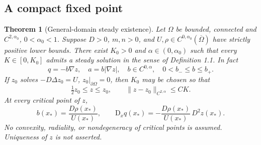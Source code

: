 \documentclass[11pt,a4paper]{article}
\newtheorem{theorem}{Theorem}[section]
\theoremstyle{definition}\newtheorem{definition}[theorem]{Definition}
\theoremstyle{remark}\newtheorem{remark}[theorem]{Remark}
\newcommand{\cl}{\overline}
\begin{document}
\subsection{A compact fixed point}
\begin{theorem}[General-domain steady existence]\label{thm:general}
Let $\Omega$ be bounded, connected and $C^{2,\alpha_0}$, $0<\alpha_0<1$. Suppose $D>0$, $m,n>0$, and $U,\rho\in C^{0,\alpha_0}(\cl\Omega)$ have strictly positive lower bounds. There exist $K_0>0$ and $\alpha\in(0,\alpha_0)$ such that every $K\in[0,K_0]$ admits a steady solution in the sense of Definition 1.1. In fact
\[
 q=-b\nabla z,\quad a=b|\nabla z|,\quad b\in C^{0,\alpha},\quad 0<b_-\leq b\leq b_+.
\]
If $z_0$ solves $-D\Delta z_0=U$, $z_0|_{\partial\Omega}=0$, then $K_0$ may be chosen so that
\begin{equation}
 \tfrac12z_0\leq z\leq z_0,\qquad
 \|z-z_0\|_{C^{2,\alpha}}\leq C K.\label{eq:smallbounds}
\end{equation}
At every critical point of $z$,
\begin{equation}
 b(x_*)=\frac{D\rho(x_*)}{U(x_*)},\qquad
 \mathrm D_xq(x_*)=-\frac{D\rho(x_*)}{U(x_*)}\,D^2z(x_*).\label{eq:criticalflux}
\end{equation}
No convexity, radiality, or nondegeneracy of critical points is assumed. Uniqueness of $z$ is not asserted.
\end{theorem}
\end{document}
